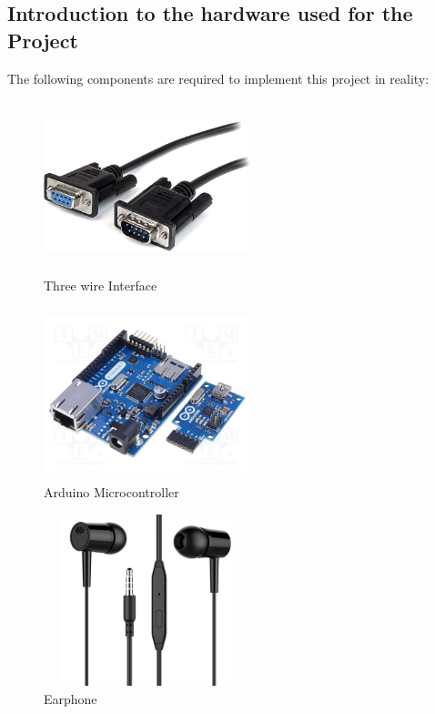\documentclass[12pt,a4paper]{article}
\begin{document}
\subsection{Introduction to the hardware used for the Project}
The following components are required to implement this project in reality:

\begin{figure}[H]
\centering
\includegraphics[width=6cm,height=5cm]{3wire.jpg}
\caption{Three wire Interface}
\label{Three wire Interface.jpg}
\end{figure}

\begin{figure}[H]
\centering
\includegraphics[width=6cm,height=5cm]{arduino.jpg}
\caption{Arduino Microcontroller}
\label{Arduino Microcontroller.jpg}
\end{figure}

\begin{figure}[H]
\centering
\includegraphics[width=6cm,height=5cm]{earphone.jpg}
\caption{Earphone}
\label{Earphone.jpg}
\end{figure}
\end{document}
